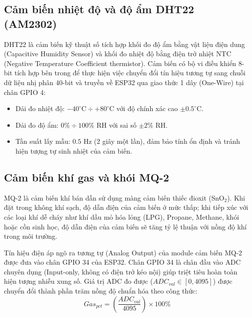 \subsection{Cảm biến nhiệt độ và độ ẩm DHT22 (AM2302)}
DHT22 là cảm biến kỹ thuật số tích hợp khối đo độ ẩm bằng vật liệu điện dung (Capacitive Humidity Sensor) và khối đo nhiệt độ bằng điện trở nhiệt NTC (Negative Temperature Coefficient thermistor). Cảm biến có bộ vi điều khiển 8-bit tích hợp bên trong để thực hiện việc chuyển đổi tín hiệu tương tự sang chuỗi dữ liệu nhị phân 40-bit và truyền về ESP32 qua giao thức 1 dây (One-Wire) tại chân GPIO 4:
\begin{itemize}
    \item Dải đo nhiệt độ: $-40^\circ\text{C} \div +80^\circ\text{C}$ với độ chính xác cao $\pm 0.5^\circ\text{C}$.
    \item Dải đo độ ẩm: $0\% \div 100\%\text{ RH}$ với sai số $\pm 2\%\text{ RH}$.
    \item Tần suất lấy mẫu: $0.5\text{ Hz}$ (2 giây một lần), đảm bảo tính ổn định và tránh hiện tượng tự sinh nhiệt của cảm biến.
\end{itemize}

\subsection{Cảm biến khí gas và khói MQ-2}
MQ-2 là cảm biến khí bán dẫn sử dụng màng cảm biến thiếc đioxit ($\text{SnO}_2$). Khi đặt trong không khí sạch, độ dẫn điện của cảm biến ở mức thấp; khi tiếp xúc với các loại khí dễ cháy như khí dầu mỏ hóa lỏng (LPG), Propane, Methane, khói hoặc cồn sinh học, độ dẫn điện của cảm biến sẽ tăng tỷ lệ thuận với nồng độ khí trong môi trường.

Tín hiệu điện áp ngõ ra tương tự (Analog Output) của module cảm biến MQ-2 được đưa vào chân GPIO 34 của ESP32. Chân GPIO 34 là chân đầu vào ADC chuyên dụng (Input-only, không có điện trở kéo nội) giúp triệt tiêu hoàn toàn hiện tượng nhiễu xung số. Giá trị ADC đo được ($ADC_{val} \in [0, 4095]$) được chuyển đổi thành phần trăm nồng độ chuẩn hóa theo công thức:
\begin{equation}
    Gas_{pct} = \left(\frac{ADC_{val}}{4095}\right) \times 100\%
    \label{eq:gas_conversion}
\end{equation}

